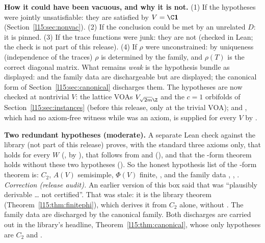 \begin{dictionary}
\textbf{How it could have been vacuous, and why it is not.} (1) If the hypotheses were jointly unsatisfiable: they are
satisfied by $V=\C\lfifteenvac$ (Section~\ref{l15:sec:nonvac}). (2) If the conclusion could be met by an unrelated $D$: it is
pinned. (3) If the trace functions were junk: they are not (checked in Lean; the check is not part of this release). (4) If $\rho$ were unconstrained: by uniqueness
(independence of the traces) $\rho$ is determined by the family, and $\rho(T)$ is the correct diagonal matrix. What remains
\emph{weak} is the hypothesis bundle as displayed: \lean{[Finite (Φ W)]} and the family data are dischargeable but are
displayed; the canonical form of Section~\ref{l15:sec:canonical} discharges them. The hypotheses are now checked at
nontrivial $V$: the lattice VOAs $V_{\sqrt{2m}\Z}$ and the $c=1$ orbifolds of Section~\ref{l15:sec:instances} (before this
release, only at the trivial VOA);
and , which had no axiom-free witness while  was an axiom, is supplied for every $V$ by
.
\end{dictionary}

\begin{warning}
\textbf{Two redundant hypotheses (moderate).} A separate Lean check against the library (not part of this release)
proves, with the standard three axioms only, that  holds for every $W$
(, by ), that  follows from
 and  (), and that the -form theorem holds without these two
hypotheses ().
So the honest hypothesis list of the -form theorem is: $C_2$, $A(V)$ semisimple, $\Phi(V)$ finite, , and the
family data , , . \emph{Correction (release audit).} An earlier version of this box said that
\lean{[Finite (Φ W)]} was ``plausibly derivable \ldots{} not certified''. That was stale: it is the library theorem
 (Theorem~\ref{l15:thm:finitephi}), which derives it from $C_2$
alone, without . The family data are discharged by the canonical family. Both discharges are carried out in
the library's headline, Theorem~\ref{l15:thm:canonical}, whose only hypotheses are $C_2$ and .
\end{warning}


